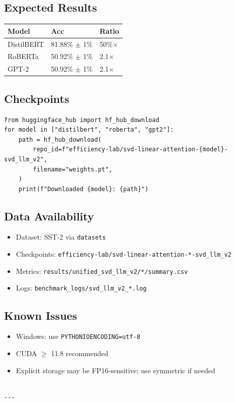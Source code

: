 \subsection{Expected Results}

\begin{table}[H]
\centering
\small
\begin{tabular}{lll}
\toprule
\textbf{Model} & \textbf{Acc} & \textbf{Ratio} \\
\midrule
DistilBERT & 81.88\% $\pm$ 1\% & 50\%$\times$ \\
RoBERTa & 50.92\% $\pm$ 1\% & 2.1$\times$ \\
GPT-2 & 50.92\% $\pm$ 1\% & 2.1$\times$ \\
\bottomrule
\end{tabular}
\end{table}

\subsection{Checkpoints}

\begin{lstlisting}
from huggingface_hub import hf_hub_download
for model in ["distilbert", "roberta", "gpt2"]:
    path = hf_hub_download(
        repo_id=f"efficiency-lab/svd-linear-attention-{model}-svd_llm_v2",
        filename="weights.pt",
    )
    print(f"Downloaded {model}: {path}")
\end{lstlisting}

\subsection{Data Availability}

\begin{itemize}
\item Dataset: SST-2 via \texttt{datasets}
\item Checkpoints: \texttt{efficiency-lab/svd-linear-attention-*-svd\_llm\_v2}
\item Metrics: \texttt{results/unified\_svd\_llm\_v2/*/summary.csv}
\item Logs: \texttt{benchmark\_logs/svd\_llm\_v2\_*.log}

\end{itemize}
\subsection{Known Issues}

\begin{itemize}
\item Windows: use \texttt{PYTHONIOENCODING=utf-8}
\item CUDA $\ge$ 11.8 recommended
\item Explicit storage may be FP16-sensitive; use symmetric if needed
\end{itemize}
\begin{lstlisting}

---
\end{lstlisting}